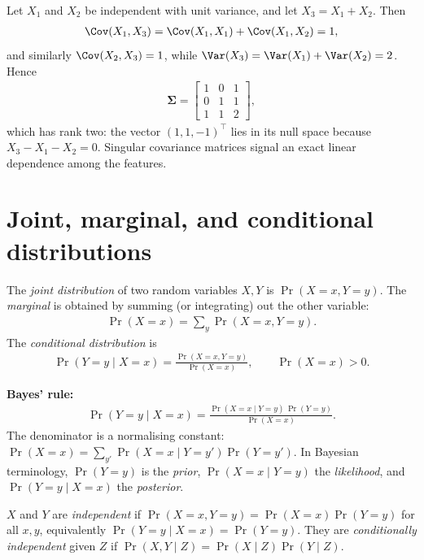 \documentclass[a4paper, 12pt]{book}
\begin{document}
\begin{example}
    Let $X_1$ and $X_2$ be independent with unit variance, and let
    $X_3=X_1+X_2$. Then
    \begin{align}
        \Cov(X_1,X_3)=\Cov(X_1,X_1)+\Cov(X_1,X_2)=1,
    \end{align}
    and similarly $\Cov(X_2,X_3)=1$, while
    $\Var(X_3)=\Var(X_1)+\Var(X_2)=2$. Hence
    \begin{align}
        \boldsymbol{\Sigma} =
        \begin{bmatrix}1&0&1\\0&1&1\\1&1&2\end{bmatrix},
    \end{align}
    which has rank two: the vector $(1,1,-1)^\top$ lies in its null space because
    $X_3-X_1-X_2=0$. Singular covariance matrices signal an exact linear
    dependence among the features.
\end{example}




\section{Joint, marginal, and conditional distributions}

The \emph{joint distribution} of two random variables $X, Y$ is
$\Pr(X = x, Y = y)$. The \emph{marginal} is obtained by summing (or integrating) out
the other variable:
\begin{align}
    \Pr(X = x) = \sum_y \Pr(X = x, Y = y).
\end{align}
The \emph{conditional distribution} is
\begin{align}
    \Pr(Y = y \mid X = x) = \frac{\Pr(X = x, Y = y)}{\Pr(X = x)},
    \qquad \Pr(X=x) > 0.
\end{align}

\textbf{Bayes' rule:}
\begin{align}
    \Pr(Y = y \mid X = x)
    = \frac{\Pr(X = x \mid Y = y) \, \Pr(Y = y)}{\Pr(X = x)}.
\end{align}
The denominator is a normalising constant:
$\Pr(X=x) = \sum_{y'} \Pr(X=x \mid Y=y')\Pr(Y=y')$. In Bayesian terminology,
$\Pr(Y=y)$ is the \emph{prior}, $\Pr(X=x\mid Y=y)$ the \emph{likelihood}, and
$\Pr(Y=y\mid X=x)$ the \emph{posterior}.

$X$ and $Y$ are \emph{independent} if
$\Pr(X=x, Y=y) = \Pr(X=x)\Pr(Y=y)$ for all $x, y$, equivalently
$\Pr(Y=y \mid X=x) = \Pr(Y=y)$. They are \emph{conditionally independent} given $Z$
if $\Pr(X,Y\mid Z) = \Pr(X\mid Z)\Pr(Y\mid Z)$.
\end{document}
